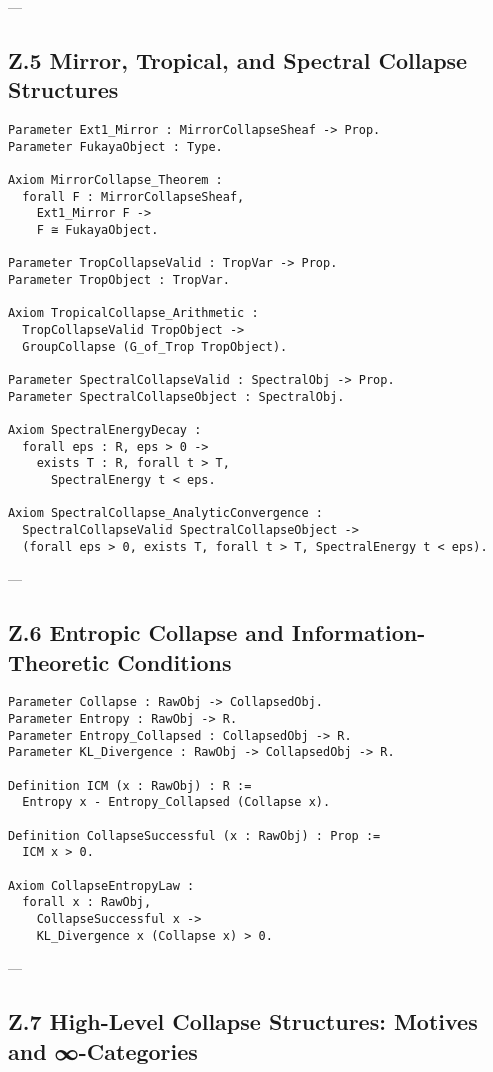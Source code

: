 \documentclass[11pt]{article}
\begin{document}
---

\subsection*{Z.5 Mirror, Tropical, and Spectral Collapse Structures}

\begin{lstlisting}[language=Coq]
Parameter Ext1_Mirror : MirrorCollapseSheaf -> Prop.
Parameter FukayaObject : Type.

Axiom MirrorCollapse_Theorem :
  forall F : MirrorCollapseSheaf,
    Ext1_Mirror F ->
    F ≅ FukayaObject.

Parameter TropCollapseValid : TropVar -> Prop.
Parameter TropObject : TropVar.

Axiom TropicalCollapse_Arithmetic :
  TropCollapseValid TropObject ->
  GroupCollapse (G_of_Trop TropObject).

Parameter SpectralCollapseValid : SpectralObj -> Prop.
Parameter SpectralCollapseObject : SpectralObj.

Axiom SpectralEnergyDecay :
  forall eps : R, eps > 0 ->
    exists T : R, forall t > T,
      SpectralEnergy t < eps.

Axiom SpectralCollapse_AnalyticConvergence :
  SpectralCollapseValid SpectralCollapseObject ->
  (forall eps > 0, exists T, forall t > T, SpectralEnergy t < eps).
\end{lstlisting}

---

\subsection*{Z.6 Entropic Collapse and Information-Theoretic Conditions}

\begin{lstlisting}[language=Coq]
Parameter Collapse : RawObj -> CollapsedObj.
Parameter Entropy : RawObj -> R.
Parameter Entropy_Collapsed : CollapsedObj -> R.
Parameter KL_Divergence : RawObj -> CollapsedObj -> R.

Definition ICM (x : RawObj) : R :=
  Entropy x - Entropy_Collapsed (Collapse x).

Definition CollapseSuccessful (x : RawObj) : Prop :=
  ICM x > 0.

Axiom CollapseEntropyLaw :
  forall x : RawObj,
    CollapseSuccessful x ->
    KL_Divergence x (Collapse x) > 0.
\end{lstlisting}

---

\subsection*{Z.7 High-Level Collapse Structures: Motives and ∞-Categories}
\end{document}
